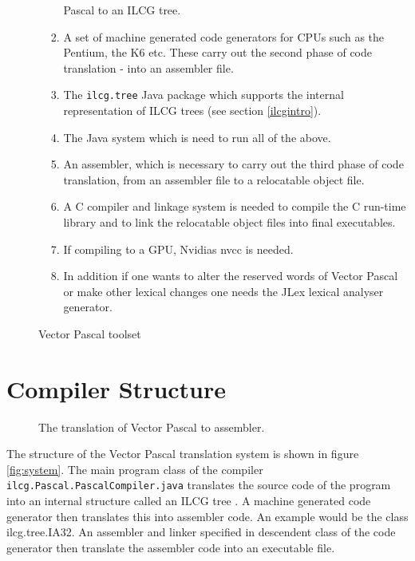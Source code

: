 \begin{enumerate}
\begin{enumerate}
\begin{enumerate}
             Pascal to an ILCG tree\cite{Cockshott00}.
             \item A set of machine generated code generators for CPUs such as the Pentium,
              the K6 etc. These carry out the second phase of code translation - into
              an assembler file.
             \item The {\tt ilcg.tree} Java package which supports the internal representation
                   of ILCG trees (see section \ref{ilcgintro}).
             \item The Java system which is need to run all of the above.
             \item An assembler, which is necessary to carry out the third phase
                   of code translation, from an assembler file to a relocatable
                   object file.
             \item A C compiler and linkage system is needed to compile the C run-time
                   library and to link the relocatable object files into final executables.
			\item If compiling to a GPU, Nvidias nvcc is needed.
             \item In addition if one wants to alter the reserved words of Vector Pascal
                   or make other lexical changes one needs the JLex lexical analyser
                   generator.

            \end{enumerate}
     \end{enumerate}

\end{enumerate}

\begin{figure}%
\caption{Vector Pascal toolset}\label{toolset}
\end{figure}


\section{Compiler Structure}

\begin{figure}[h]\center
{}
\caption{The translation of Vector Pascal to assembler.}\label{system}
\end{figure}
The structure of the  Vector Pascal translation
 system is shown in figure \ref{fig:system}.
The main program class of the compiler {\tt ilcg.Pascal.PascalCompiler.java} translates
the source code of the program into an internal structure called an ILCG tree
\cite{Cockshott00}. A machine generated code generator then translates this
into assembler code. An example would be the class ilcg.tree.IA32. An assembler
and linker specified in descendent class of the code generator then translate
the assembler code into an executable file.



